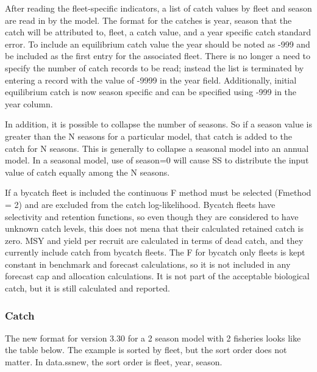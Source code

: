 After reading the fleet-specific indicators, a list of catch values by fleet and season are read in by the model.  The format for the catches is year, season that the catch will be attributed to, fleet, a catch value, and a year specific catch standard error.   To include an equilibrium catch value the year should be noted as -999 and be included as the first entry for the associated fleet.  There is no longer a need to specify the number of catch records to be read; instead the list is terminated by entering a record with the value of -9999 in the year field.  Additionally, initial equilibrium catch is now season specific and can be specified using -999 in the year column.

In addition, it is possible to collapse the number of seasons.  So if a season value is greater than the N seasons for a particular model, that catch is added to the catch for N seasons.  This is generally to collapse a seasonal model into an annual model.  In a seasonal model, use of season=0 will cause SS to distribute the input value of catch equally among the N seasons.

If a bycatch fleet is included the continuous F method must be selected (F\textunderscore method = 2) and are excluded from the catch log-likelihood.  Bycatch fleets have selectivity and retention functions, so even though they are considered to have unknown catch levels, this does not mena that their calculated retained catch is zero.  MSY and yield per recruit are calculated in terms of dead catch, and they currently include catch from bycatch fleets.  The F for bycatch only fleets is kept constant in benchmark and forecast calculations, so it is not included in any forecast cap and allocation calculations.  It is not part of the acceptable biological catch, but it is still calculated and reported.  

\subsubsection{Catch}
The new format for version 3.30 for a 2 season model with 2 fisheries looks like the table below.  The example is sorted by fleet, but the sort order does not matter.  In data.ss\textunderscore new, the sort order is fleet, year, season.

